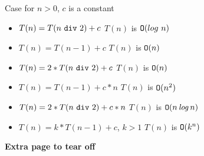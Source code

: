 \documentclass[answers,addpoints,12pt]{exam}
\begin{document}
Case for $n>0$, $c$ is a constant
\begin{itemize}
\item $T(n)=T(n\ {\tt div}\ 2) + c$\hfill
 $T(n)$ is ${\tt O}(log\ n)$
 
 \item $T(n)=T(n-1)+c$\hfill
 $T(n)$ is ${\tt O}(n)$
 
 \item $T(n)=2*T(n\ {\tt div}\ 2)+c$\hfill
 $T(n)$ is ${\tt O}(n)$
 
 \item $T(n)=T(n-1)+c*n$\hfill
 $T(n)$ is ${\tt O}(n^2)$
 
 \item $T(n)=2*T(n\ {\tt div}\ 2)+c*n$\hfill
 $T(n)$ is ${\tt O}(n\,{\it log}\,n)$
 
 \item $T(n) = k*T(n-1) + c$, $k>1$\hfill
 $T(n)$ is ${\tt O}(k^n)$
\end{itemize}

\newpage
\textbf{Extra page to tear off}
\end{document}
